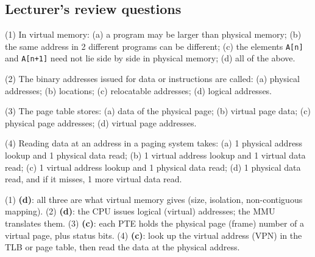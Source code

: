\subsection{Lecturer's review questions}

\begin{exercise}[Lecturer 1--4]
(1) In virtual memory: (a) a program may be larger than physical memory; (b) the same
address in 2 different programs can be different; (c) the elements \texttt{A[n]} and
\texttt{A[n+1]} need not lie side by side in physical memory; (d) all of the above.

(2) The binary addresses issued for data or instructions are called: (a) physical
addresses; (b) locations; (c) relocatable addresses; (d) logical addresses.

(3) The page table stores: (a) data of the physical page; (b) virtual page data;
(c) physical page addresses; (d) virtual page addresses.

(4) Reading data at an address in a paging system takes: (a) 1 physical address
lookup and 1 physical data read; (b) 1 virtual address lookup and 1 virtual data
read; (c) 1 virtual address lookup and 1 physical data read; (d) 1 physical data
read, and if it misses, 1 more virtual data read.
\end{exercise}
\begin{solution}
(1) \textbf{(d)}: all three are what virtual memory gives (size, isolation,
non-contiguous mapping).
(2) \textbf{(d)}: the CPU issues logical (virtual) addresses; the MMU translates
them.
(3) \textbf{(c)}: each PTE holds the physical page (frame) number of a virtual page,
plus status bits.
(4) \textbf{(c)}: look up the virtual address (VPN) in the TLB or page table, then
read the data at the physical address.
\end{solution}


